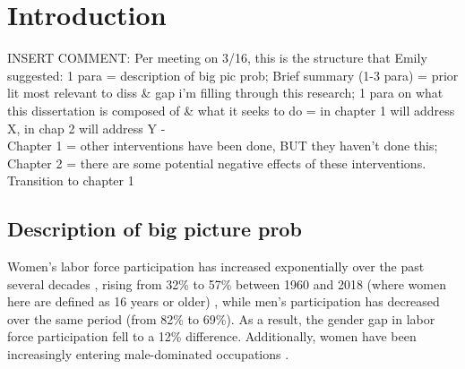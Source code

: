 \documentclass[a4paper,nobind]{templates/ociamthesis}
\begin{document}
\setlength{\textbaselineskip}{22pt plus2pt}

\setlength{\parskip}{2pt plus 1pt}

\setlength{\baselineskip}{\textbaselineskip}

\hypertarget{introduction}{%
\chapter*{Introduction}\label{introduction}}

\adjustmtc
{}

INSERT COMMENT: Per meeting on 3/16, this is the structure that Emily suggested: 1 para = description of big pic prob;
Brief summary (1-3 para) = prior lit most relevant to diss \& gap i'm filling through this research; 1 para on what this dissertation is composed of \& what it seeks to do = in chapter 1 will address X, in chap 2 will address Y -\\
Chapter 1 = other interventions have been done, BUT they haven't done this; Chapter 2 = there are some potential negative effects of these interventions. Transition to chapter 1

\hypertarget{description-of-big-picture-prob}{%
\section{Description of big picture prob}\label{description-of-big-picture-prob}}

Women's labor force participation has increased exponentially over the past several decades \autocite{Goldin2006a,Statistics2020}, rising from 32\% to 57\% between 1960 and 2018 (where women here are defined as 16 years or older) \autocite{Statistics2020,Blau2017,Eagly2019}, while men's participation has decreased over the same period (from 82\% to 69\%). As a result, the gender gap in labor force participation fell to a 12\% difference. Additionally, women have been increasingly entering male-dominated occupations \autocite{Blau2013,Reskin2009,England2010}.
\end{document}
